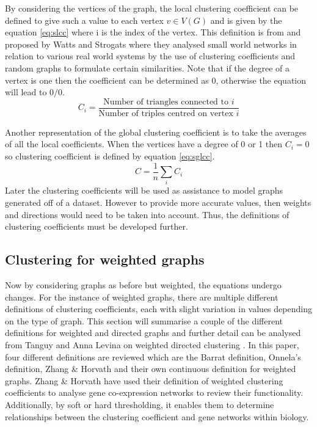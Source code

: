 By considering the vertices of the graph, the local clustering coefficient can be defined to give such a value to each vertex $v\in V(G)$ and is given by the equation \ref{eq:slcc} where i is the index of the vertex. This definition is from \cite{Newman_2003} and proposed by Watts and Strogats \cite{Watts1998} where they analysed small world networks in relation to various real world systems by the use of clustering coefficients and random graphs to formulate certain similarities. Note that if the degree of a vertex is one then the coefficient can be determined as 0, otherwise the equation will lead to $0/0$.
\begin{equation} \label{eq:slcc}
C_i = \frac{\text{Number of triangles connected to $i$}}{\text{Number of triples centred on vertex $i$}}
\end{equation}

Another representation of the global clustering coefficient is to take the averages of all the local coefficients\cite{https://doi.org/10.48550/arxiv.1410.1997}. When the vertices have a degree of 0 or 1 then $C_i = 0$ so clustering coefficient is defined by equation \ref{eq:sglcc}.
\begin{equation} \label{eq:sglcc}
C = \frac{1}{n}\sum_i{C_i}
\end{equation}
Later the clustering coefficients will be used as assistance to model graphs generated off of a dataset. However to provide more accurate values, then weights and directions would need to be taken into account. Thus, the definitions of clustering coefficients must be developed further.

\subsection{Clustering for weighted graphs}
Now by considering graphs as before but weighted, the equations undergo changes. For the instance of weighted graphs, there are multiple different definitions of clustering coefficients, each with slight variation in values depending on the type of graph. This section will summarise a couple of the different definitions for weighted and directed graphs and further detail can be analysed from Tanguy and Anna Levina on weighted directed clustering \cite{PhysRevResearch.3.043124}. In this paper, four different definitions are reviewed which are the Barrat definition, Onnela's definition, Zhang \& Horvath and their own continuous definition for weighted graphs. Zhang \& Horvath\cite{ZhangHorvath+2005} have used their definition of weighted clustering coefficients to analyse gene co-expression networks to review their functionality. Additionally, by soft or hard thresholding, it enables them to determine relationships between the clustering coefficient and gene networks within biology.

